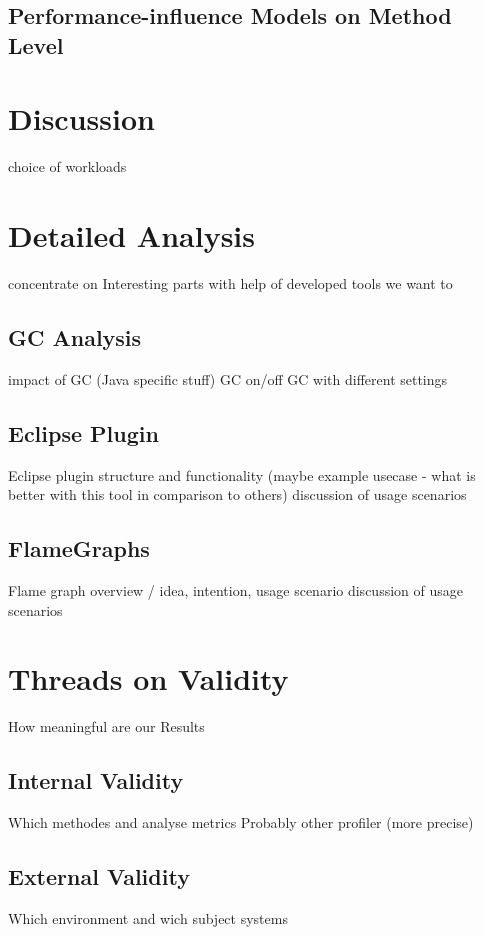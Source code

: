 \subsection{Performance-influence Models on Method Level}
\label{perf_infl_models_m_lvl}


\section{Discussion}
\label{discussion}

choice of workloads


\section{Detailed Analysis}
\label{delailed_analysis}

concentrate on Interesting parts
with help of developed tools we want to

\subsection{GC Analysis}
\label{gc_analysis}

impact of GC (Java specific stuff)
GC on/off
GC with different settings

\subsection{Eclipse Plugin}
\label{eclipse_plugin}

Eclipse plugin structure and functionality (maybe example usecase - what is better with this tool in comparison to others)
discussion of usage scenarios

\subsection{FlameGraphs}
\label{flame_graph}

Flame graph overview / idea, intention, usage scenario
discussion of usage scenarios

\section{Threads on Validity}
\label{validity}
How meaningful are our Results

\subsection{Internal Validity}

Which methodes and analyse metrics
Probably other profiler (more precise)


\subsection{External Validity}

Which environment and wich subject systems
